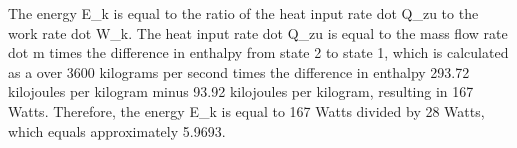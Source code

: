 The energy E_k is equal to the ratio of the heat input rate dot Q_zu to the work rate dot W_k. The heat input rate dot Q_zu is equal to the mass flow rate dot m times the difference in enthalpy from state 2 to state 1, which is calculated as a over 3600 kilograms per second times the difference in enthalpy 293.72 kilojoules per kilogram minus 93.92 kilojoules per kilogram, resulting in 167 Watts. Therefore, the energy E_k is equal to 167 Watts divided by 28 Watts, which equals approximately 5.9693.
